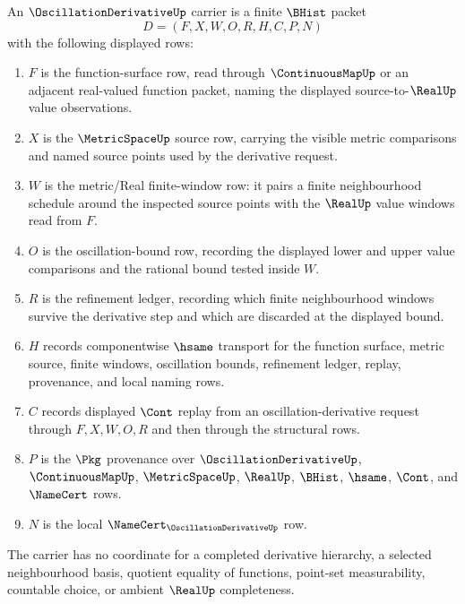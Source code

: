 \begin{definition}
\label{def:oscillation-derivative-carrier}
An $\OscillationDerivativeUp$ carrier is a finite $\BHist$ packet
$$
D=(F,X,W,O,R,H,C,P,N)
$$
with the following displayed rows:
\begin{enumerate}
\item $F$ is the function-surface row, read through $\ContinuousMapUp$ or an adjacent real-valued function packet, naming the displayed source-to-$\RealUp$ value observations.
\item $X$ is the $\MetricSpaceUp$ source row, carrying the visible metric comparisons and named source points used by the derivative request.
\item $W$ is the metric/Real finite-window row: it pairs a finite neighbourhood schedule around the inspected source points with the $\RealUp$ value windows read from $F$.
\item $O$ is the oscillation-bound row, recording the displayed lower and upper value comparisons and the rational bound tested inside $W$.
\item $R$ is the refinement ledger, recording which finite neighbourhood windows survive the derivative step and which are discarded at the displayed bound.
\item $H$ records componentwise $\hsame$ transport for the function surface, metric source, finite windows, oscillation bounds, refinement ledger, replay, provenance, and local naming rows.
\item $C$ records displayed $\Cont$ replay from an oscillation-derivative request through $F,X,W,O,R$ and then through the structural rows.
\item $P$ is the $\Pkg$ provenance over $\OscillationDerivativeUp$, $\ContinuousMapUp$, $\MetricSpaceUp$, $\RealUp$, $\BHist$, $\hsame$, $\Cont$, and $\NameCert$ rows.
\item $N$ is the local $\NameCert_{\OscillationDerivativeUp}$ row.
\end{enumerate}
The carrier has no coordinate for a completed derivative hierarchy, a selected neighbourhood basis, quotient equality of functions, point-set measurability, countable choice, or ambient $\RealUp$ completeness.
\end{definition}

